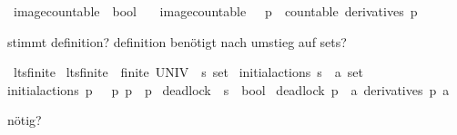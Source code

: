 \begin{isabellebody}
\isanewline
{}\isamarkupfalse%
\ image{\isacharunderscore}{\kern0pt}countable\ {\isacharcolon}{\kern0pt}{\isacharcolon}{\kern0pt}\ {\isacartoucheopen}bool{\isacartoucheclose}\isanewline
\ \ \ {\isacartoucheopen}image{\isacharunderscore}{\kern0pt}countable\ {\isasymequiv}\ {\isacharparenleft}{\kern0pt}{\isasymforall}\ p\ {\isasymalpha}{\isachardot}{\kern0pt}\ countable\ {\isacharparenleft}{\kern0pt}derivatives\ p\ {\isasymalpha}{\isacharparenright}{\kern0pt}{\isacharparenright}{\kern0pt}{\isacartoucheclose}%
\begin{isamarkuptext}%
stimmt definition? definition benötigt nach umstieg auf sets?%
\end{isamarkuptext}\isamarkuptrue%
\isamarkupfalse%
\ lts{\isacharunderscore}{\kern0pt}finite\ \isanewline
{\isacartoucheopen}lts{\isacharunderscore}{\kern0pt}finite\ {\isasymequiv}\ {\isacharparenleft}{\kern0pt}finite\ {\isacharparenleft}{\kern0pt}UNIV\ {\isacharcolon}{\kern0pt}{\isacharcolon}{\kern0pt}\ {\isacharprime}{\kern0pt}s\ set{\isacharparenright}{\kern0pt}{\isacharparenright}{\kern0pt}{\isacartoucheclose}\isanewline
\isanewline
{}\isamarkupfalse%
\ initial{\isacharunderscore}{\kern0pt}actions{\isacharcolon}{\kern0pt}{\isacharcolon}{\kern0pt}\ {\isacartoucheopen}{\isacharprime}{\kern0pt}s\ {\isasymRightarrow}\ {\isacharprime}{\kern0pt}a\ set{\isacartoucheclose}\isanewline
\ \ \isanewline
{\isacartoucheopen}initial{\isacharunderscore}{\kern0pt}actions\ p\ {\isasymequiv}\ {\isacharbraceleft}{\kern0pt}{\isasymalpha}{\isacharbar}{\kern0pt}{\isasymalpha}{\isachardot}{\kern0pt}\ {\isacharparenleft}{\kern0pt}{\isasymexists}p{\isacharprime}{\kern0pt}{\isachardot}{\kern0pt}\ p\ {\isasymmapsto}{\isasymalpha}\ p{\isacharprime}{\kern0pt}{\isacharparenright}{\kern0pt}{\isacharbraceright}{\kern0pt}{\isacartoucheclose}\isanewline
\isanewline
{}\isamarkupfalse%
\ deadlock\ {\isacharcolon}{\kern0pt}{\isacharcolon}{\kern0pt}\ {\isacartoucheopen}{\isacharprime}{\kern0pt}s\ {\isasymRightarrow}\ bool{\isacartoucheclose}\ \isanewline
{\isacartoucheopen}deadlock\ p\ {\isasymequiv}\ {\isacharparenleft}{\kern0pt}{\isasymforall}a{\isachardot}{\kern0pt}\ derivatives\ p\ a\ {\isacharequal}{\kern0pt}\ {\isacharbraceleft}{\kern0pt}{\isacharbraceright}{\kern0pt}{\isacharparenright}{\kern0pt}{\isacartoucheclose}%
\begin{isamarkuptext}%
nötig?%
\end{isamarkuptext}\isamarkuptrue%

\end{isabellebody}
